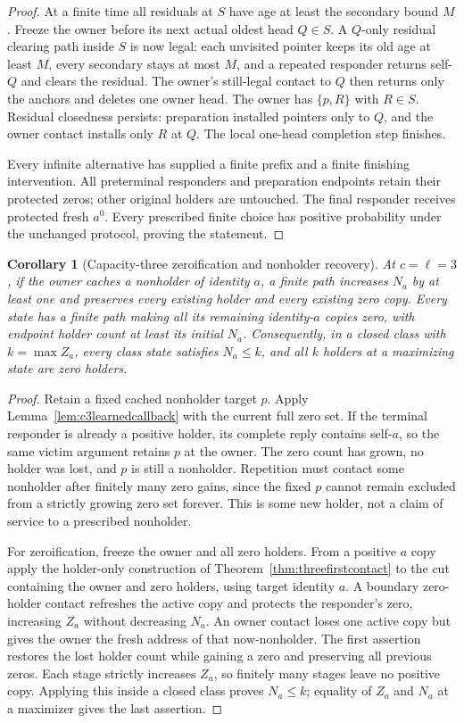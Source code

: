 \documentclass[11pt]{article}
\newtheorem{corollary}[theorem]{Corollary}
\begin{document}
\begin{proof}
At a finite time all residuals at $S$ have age at least
the secondary bound $M$. Freeze the owner before its next
actual oldest head $Q\in S$. A $Q$-only residual clearing
path inside $S$ is now legal: each unvisited pointer keeps
its old age at least $M$, every secondary stays at most
$M$, and a repeated responder returns self-$Q$ and clears
the residual. The owner's still-legal contact to $Q$ then
returns only the anchors and deletes one owner head. The
owner has $\{p,R\}$ with $R\in S$. Residual closedness
persists: preparation installed pointers only to $Q$, and
the owner contact installs only $R$ at $Q$. The local
one-head completion step finishes.

Every infinite alternative has supplied a finite prefix
and a finite finishing intervention. All preterminal
responders and preparation endpoints retain their protected
zeros; other original holders are untouched. The final
responder receives protected fresh $a^0$. Every prescribed
finite choice has positive probability under the unchanged
protocol, proving the statement.
\end{proof}

\begin{corollary}[Capacity-three zeroification and nonholder recovery]
\label{cor:c3zeroify}
At $c=\ell=3$, if the owner caches a nonholder of identity
$a$, a finite path increases $N_a$ by at least one and
preserves every existing holder and every existing zero copy. Every state has a finite
path making all its remaining identity-$a$ copies zero,
with endpoint holder count at least its initial $N_a$.
Consequently, in a closed class with $k=\max Z_a$, every
class state satisfies $N_a\le k$, and all $k$ holders at
a maximizing state are zero holders.
\end{corollary}
\begin{proof}
Retain a fixed cached nonholder target $p$. Apply
Lemma~\ref{lem:c3learnedcallback} with the current full zero
set. If the terminal responder is already a positive holder,
its complete reply contains self-$a$, so the same victim
argument retains $p$ at the owner. The zero count has grown,
no holder was lost, and $p$ is still a nonholder. Repetition
must contact some nonholder after finitely many zero gains,
since the fixed $p$ cannot remain excluded from a strictly
growing zero set forever. This is some new holder, not a
claim of service to a prescribed nonholder.

For zeroification, freeze the owner and all zero holders.
From a positive $a$ copy apply the holder-only construction
of Theorem~\ref{thm:threefirstcontact} to the cut containing
the owner and zero holders, using target identity $a$.
A boundary zero-holder contact refreshes the active copy
and protects the responder's zero, increasing $Z_a$ without
decreasing $N_a$. An owner contact loses one active copy but
gives the owner the fresh address of that now-nonholder.
The first assertion restores the lost holder count while
gaining a zero and preserving all previous zeros. Each
stage strictly increases $Z_a$, so finitely many stages
leave no positive copy. Applying this inside a closed
class proves $N_a\le k$; equality of $Z_a$ and $N_a$ at a
maximizer gives the last assertion.
\end{proof}
\end{document}
